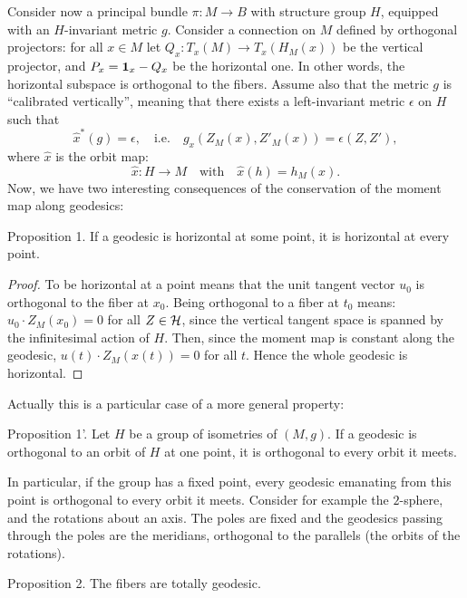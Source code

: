 Consider now a principal bundle $\pi : M \to B$ with structure group $H$,
equipped with an $H$-invariant metric $g$.
Consider a connection on $M$ defined by orthogonal projectors:
for all $x \in M$ let $Q_x : T_x(M) \to T_x(H_M(x))$ be the vertical projector,
and $P_x = {\mathbf{1}}_x - Q_x$ be the horizontal one.
In other words, the horizontal subspace is orthogonal to the fibers.
Assume also that the metric $g$ is ``calibrated vertically'',
meaning that there exists a left-invariant metric $\epsilon$ on $H$ such that
$$%
  \hat x^*(g) = \epsilon,
  \quad \text{i.e.} \quad g_x(Z_M(x),Z'_M(x)) = \epsilon(Z,Z'),
  $$%
where $\hat x$ is the orbit map:
$$%
  \hat x : H \to M
  \quad \text{with} \quad
  \hat x(h) = h_M(x).
  $$%
Now,
we have two interesting consequences of the conservation of the moment map along geodesics:

\begin{Article}{Proposition 1.}{}
  If a geodesic is horizontal at some point,
  it is horizontal at every point.
\end{Article}

\begin{proof}
  To be horizontal at a point means that the unit tangent vector $u_0$ is orthogonal to the fiber at $x_0$.
  Being orthogonal to a fiber at $t_0$ means:
  $u_0 \cdot Z_M(x_0) = 0$ for all $Z \in \mathcal{H}$,
  since the vertical tangent space is spanned by the infinitesimal action of $H$.
  Then,
  since the moment map is constant along the geodesic,
  $u(t) \cdot Z_M(x(t)) = 0$ for all $t$.
  Hence the whole geodesic is horizontal.
\end{proof}

Actually this is a particular case of a more general property:

\begin{Article}{Proposition 1'.}{}
  Let $H$ be a group of isometries of $(M,g)$.
  If a geodesic is orthogonal to an orbit of $H$ at one point,
  it is orthogonal to every orbit it meets.
\end{Article}

In particular,
if the group has a fixed point,
every geodesic emanating from this point is orthogonal to every orbit it meets.
Consider for example the $2$-sphere,
and the rotations about an axis.
The poles are fixed and the geodesics passing through the poles are the meridians,
orthogonal to the parallels (the orbits of the rotations).

\begin{Article}{Proposition 2.}{}
  The fibers are totally geodesic.
\end{Article}

